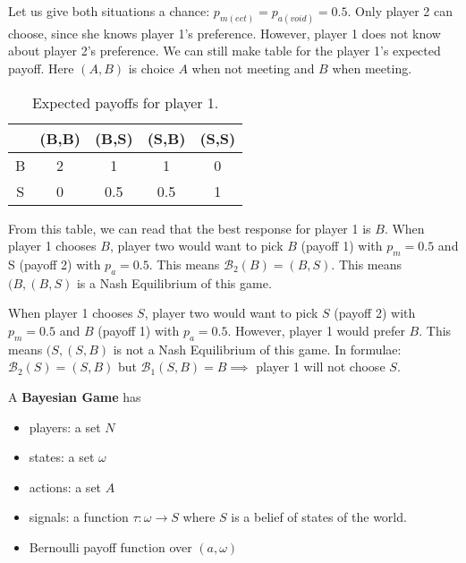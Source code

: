 \begin{example}
      Let us give both situations a chance: $p_{m(eet)} = p_{a(void)} = 0.5$.
      Only player 2 can choose, since she knows player 1's preference.
      However, player 1 does not know about player 2's preference.
      We can still make table for the player 1's expected payoff.
      Here $(A,B)$ is choice $A$ when not meeting and $B$ when meeting.

      \begin{table}[h!]
            \begin{center}
                  \begin{tabular}{ c | c c c c}
                          & (B,B) & (B,S) & (S,B) & (S,S) \\ \hline
                        B & 2     & 1     & 1     & 0     \\
                        S & 0     & 0.5   & 0.5   & 1
                  \end{tabular}
                  \vspace{-5pt}
                  \caption{Expected payoffs for player 1.}
                  \vspace{-25pt}
                  \label{table:payoff1}
            \end{center}

      \end{table}

      From this table, we can read that the best response for player 1 is $B$.
      When player 1 chooses $B$, player two would want to pick $B$ (payoff 1) with $p_{m} = 0.5$ and S (payoff 2) with $p_{a} = 0.5$.
      This means $\mathcal B_2 (B) = (B,S)$. This means $(B,(B,S)$ is a Nash Equilibrium of this game.

      When player 1 chooses $S$, player two would want to pick $S$ (payoff 2) with $p_{m} = 0.5$ and $B$ (payoff 1) with $p_{a} = 0.5$.
      However, player 1 would prefer $B$. This means $(S,(S,B)$ is not a Nash Equilibrium of this game.
      In formulae: $\mathcal B_2(S) = (S,B)$ but $\mathcal B_1(S,B) = B \implies$ player 1 will not choose $S$.
\end{example}


\begin{definition}
      A \textbf{Bayesian Game} has
      \begin{itemize}
            \item players: a set $N$
            \item states: a set  $\omega$
            \item actions: a set $A$
            \item signals: a function $\tau : \omega \to S$ where $S$ is a belief of states of the world.
            \item Bernoulli payoff function over $(a, \omega )$
      \end{itemize}
\end{definition}


